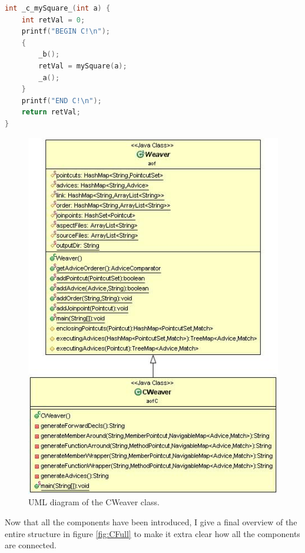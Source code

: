 \documentclass[a4paper]{report}
\begin{document}
\begin{lstlisting}[language=C, caption=A generated method for an around advice with advice nested within, label=lst:SmallC_ComplexAround]
int _c_mySquare_(int a) {
	int retVal = 0;
	printf("BEGIN C!\n");
	{
		_b();
		retVal = mySquare(a);
		_a();
	}
	printf("END C!\n");
	return retVal;
}
\end{lstlisting}
\begin{figure}
\centering
\includegraphics[scale=0.7]{images/AOFC/CWeaver.jpg}
\caption{UML diagram of the CWeaver class.}
\label{fig:CWeaver}
\end{figure}
Now that all the components have been introduced, I give a final overview of the entire structure in figure \ref{fig:CFull} to make it extra clear how all the components are connected.
\end{document}
